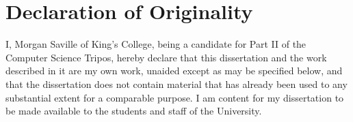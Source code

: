\newpage
\chapter*{Declaration of Originality}

I, Morgan Saville of King's College, being a candidate for Part II of the Computer Science Tripos, hereby declare that this dissertation and the work described in it are my own work, unaided except as may be specified below, and that the dissertation does not contain
material that has already been used to any substantial extent for a comparable purpose. I am content for my dissertation to be made available to the students and staff of the University.

\bigskip
{}

\medskip
{}